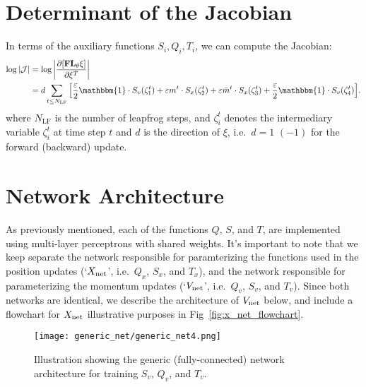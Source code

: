 \documentclass[main.tex]{subfiles}
\begin{document}
\section{Determinant of the Jacobian}
In terms of the auxiliary functions $S_{i}, Q_{i}, T_{i}$, we can compute the Jacobian:
%
\begin{align}
  \log|\mathcal{J}| 
  &= \log\bigg|\frac{\partial{\left[\mathbf{FL}_{\theta}\xi\right]}}{\partial \xi^{T}}\bigg|\\
  &= d \sum_{t\leq N_{\mathrm{LF}}}
    {\left[\frac{\eps}{2} \mathbbm{1}\cdot S_{v}(\zeta_{1}^{t}) + \eps m^{t} \cdot S_{x}(\zeta_{2}^{t}) 
      + \eps \bar{m}^{t} \cdot S_{x}(\zeta_{3}^{t}) + \frac{\eps}{2}\mathbbm{1} \cdot S_{v}(\zeta_{4}^{t})\right]}.
\end{align}
%
where $N_{\mathrm{LF}}$ is the number of leapfrog steps, and $\zeta_{i}^{t}$ denotes the intermediary variable
$\zeta_{i}^{t}$ at time step $t$ and $d$ is the direction of $\xi$, i.e.\ $d = 1 \,\, (-1)$ for the forward (backward)
update.
%
\section{Network Architecture}%
\label{subsec:l2hmc_network}
As previously mentioned, each of the functions $Q$, $S$, and $T$, are implemented using multi-layer perceptrons with
shared weights.
%
It's important to note that we keep separate the network responsible for paramterizing the functions used in the
position updates (`${X_{\mathrm{net}}}$', i.e.\ $Q_x$, $S_x$, and $T_x$), and the network responsible for parameterizing the
momentum updates (`${V_{\mathrm{net}}}$', i.e.\ $Q_v$, $S_v$, and $T_v$).
%
Since both networks are identical, we describe the architecture of ${V_{\mathrm{net}}}$ below, and include a flowchart for ${X_{\mathrm{net}}}$ 
illustrative purposes in Fig~\ref{fig:x_net_flowchart}.
%
%
\begin{figure}[htpb]
  \centering
  \texttt{[image: generic\_net/generic\_net4.png]}
  \caption{Illustration showing the generic (fully-connected) network architecture for training $S_v$, $Q_v$, and
  $T_v$.}%
\label{fig:generic_net}
\end{figure}
%
%
%
\end{document}
